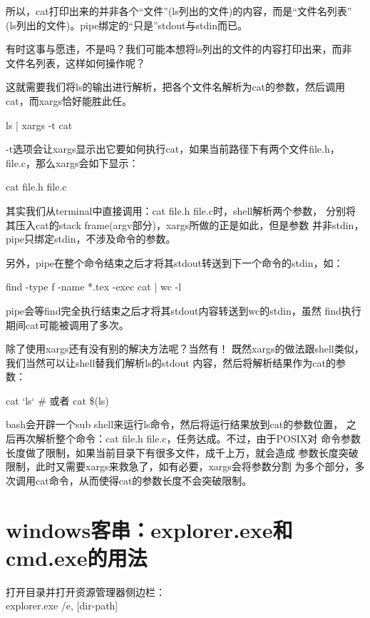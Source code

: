 ﻿\documentclass[a4paper,11pt]{article}
\begin{document}
  所以，cat打印出来的并非各个“文件”(ls列出的文件)的内容，而是“文件名列表”
  (ls列出的文件)。pipe绑定的“只是”stdout与stdin而已。

  有时这事与愿违，不是吗？我们可能本想将ls列出的文件的内容打印出来，而非
  文件名列表，这样如何操作呢？

  这就需要我们将ls的输出进行解析，把各个文件名解析为cat的参数，然后调用
  cat，而xargs恰好能胜此任。

  \begin{bashcode}
    ls | xargs -t cat
  \end{bashcode}

  -t选项会让xargs显示出它要如何执行cat，如果当前路径下有两个文件file.h，
  file.c，那么xargs会如下显示：

  \begin{bashcode}
    cat file.h file.c
  \end{bashcode}

  其实我们从terminal中直接调用：cat file.h file.c时，shell解析两个参数，
  分别将其压入cat的stack frame(argv部分)，xargs所做的正是如此，但是参数
  并非stdin，pipe只绑定stdin，不涉及命令的参数。

  另外，pipe在整个命令结束之后才将其stdout转送到下一个命令的stdin，如：
  
  \begin{bashcode}
    find -type f -name *.tex -exec cat {} \; | wc -l
  \end{bashcode}

  pipe会等find完全执行结束之后才将其stdout内容转送到wc的stdin，虽然
  find执行期间cat可能被调用了多次。


  除了使用xargs还有没有别的解决方法呢？当然有！
  既然xargs的做法跟shell类似，我们当然可以让shell替我们解析ls的stdout
  内容，然后将解析结果作为cat的参数：

  \begin{bashcode}
    cat `ls`
    # 或者
    cat \$(ls)
  \end{bashcode}

  bash会开辟一个sub shell来运行ls命令，然后将运行结果放到cat的参数位置，
  之后再次解析整个命令：cat file.h file.c，任务达成。不过，由于POSIX对
  命令参数长度做了限制，如果当前目录下有很多文件，成千上万，就会造成
  参数长度突破限制，此时又需要xargs来救急了，如有必要，xargs会将参数分割
  为多个部分，多次调用cat命令，从而使得cat的参数长度不会突破限制。

  \section[Windows客串：explorer.exe和cmd.exe的用法]{windows客串：explorer.exe和cmd.exe的用法}
  打开目录并打开资源管理器侧边栏：\\
  explorer.exe /e, [dir-path]
\end{document}
